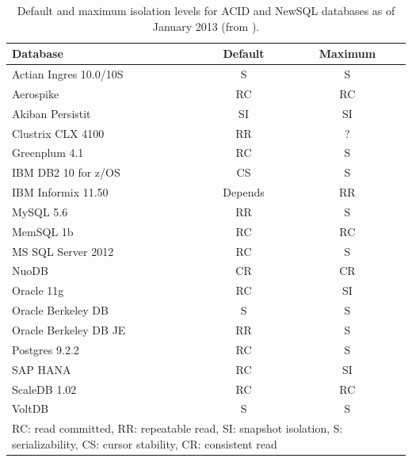 \begin{table}
\begin{small}
\begin{tabular}{|l|c|c|}
\hline
Database & Default & Maximum\\\hline
Actian Ingres 10.0/10S~\cite{actian-docs} & S & S\\
Aerospike~\cite{aerospike-docs} & RC & RC\\
Akiban Persistit~\cite{akiban-docs} & SI & SI\\
Clustrix CLX 4100~\cite{clustrix-docs} & RR & ?\\
Greenplum 4.1~\cite{greenplum-docs} & RC & S \\
IBM DB2 10 for z/OS~\cite{db2-docs} & CS & S\\
IBM Informix 11.50~\cite{informix-docs} & Depends & RR\\
MySQL 5.6~\cite{innodb-docs} & RR & S \\
MemSQL 1b~\cite{memsql-docs} & RC & RC\\
MS SQL Server 2012~\cite{ms-sql-docs} & RC & S \\
NuoDB~\cite{nuodb-docs} & CR & CR\\
Oracle 11g~\cite{oracle-docs} & RC & SI\\
Oracle Berkeley DB~\cite{bdb-reg-docs} & S & S\\
Oracle Berkeley DB JE~\cite{bdb-je-docs} & RR & S\\
Postgres 9.2.2~\cite{postgres-docs} & RC & S\\
SAP HANA~\cite{hana-docs} & RC & SI\\
ScaleDB 1.02~\cite{scaledb-docs} & RC & RC\\
VoltDB~\cite{voltdb-docs} & S & S\\
\hline
\multicolumn{3}{|p{7cm}|}{{\footnotesize RC: read committed, RR: repeatable read, SI: snapshot isolation, S: serializability, CS: cursor stability, CR: consistent read}}\\\hline

\end{tabular}
\caption{Default and maximum isolation levels for ACID and NewSQL
  databases as of January 2013 (from
  \protect\cite{needed-hotos}).}\vspace{-1.5em}
\label{table:existing}
\end{small}
\end{table}

